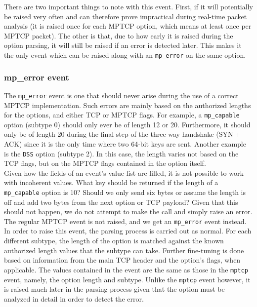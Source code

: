 There are two important things to note with this event. First, if it will potentially be raised very often and can therefore prove impractical during real-time packet analysis (it is raised once for each MPTCP option, which means at least once per MPTCP packet). The other is that, due to how early it is raised during the option parsing, it will still be raised if an error is detected later. This makes it the only event which can be raised along with an \texttt{mp\_error} on the same option.

\subsubsection{mp\_error event}
The \texttt{mp\_error} event is one that should never arise during the use of a correct MPTCP implementation. Such errors are mainly based on the authorized lengths for the options, and either TCP or MPTCP flags. For example, a \texttt{mp\_capable} option (subtype 0) should only ever be of length 12 or 20. Furthermore, it should only be of length 20 during the final step of the three-way handshake (SYN + ACK) since it is the only time where two 64-bit keys are sent. Another example is the \texttt{DSS} option (subtype 2). In this case, the length varies not based on the TCP flags, but on the MPTCP flags contained in the option itself. \\

Given how the fields of an event's value-list are filled, it is not possible to work with incoherent values. What key should be returned if the length of a \texttt{mp\_capable} option is 10? Should we only send six bytes or assume the length is off and add two bytes from the next option or TCP payload? Given that this should not happen, we do not attempt to make the call and simply raise an error. The regular MPTCP event is not raised, and we get an \texttt{mp\_error} event instead.\\

In order to raise this event, the parsing process is carried out as normal. For each  different subtype, the length of the option is matched against the known authorized length values that the subtype can take. Further fine-tuning is done based on information from the main TCP header and the option's flags, when applicable. The values contained in the event are the same as those in the \texttt{mptcp} event, namely, the option length and subtype. Unlike the \texttt{mptcp} event however, it is raised much later in the parsing process given that the option must be analyzed in detail in order to detect the error.\\


